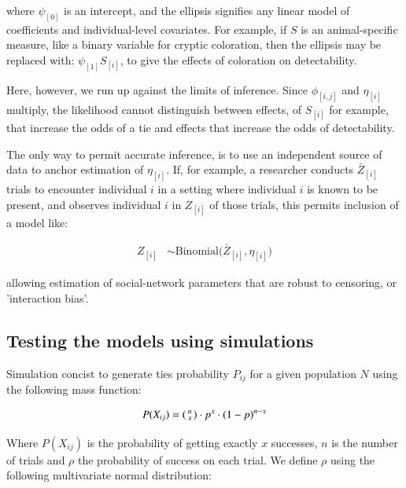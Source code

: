 \documentclass[Afour,sageh,times]{sagej}
\begin{document}
where $\psi_{[0]}$ is an intercept, and the ellipsis signifies any linear model of coefficients and individual-level covariates. For example, if $S$ is an animal-specific measure, like a binary variable for cryptic coloration, then the ellipsis  may be replaced with:  $\psi_{[1]}S_{[i]}$, to give the effects of coloration on detectability.

Here, however, we run up against the limits of inference. Since $\phi_{[i,j]}$ and $\eta_{[i]}$ multiply, the likelihood cannot distinguish between effects, of $S_{[i]}$ for example, that increase the odds of a tie and effects that increase the odds of detectability.

The only way to permit accurate inference, is to use an independent source of data to anchor estimation of $\eta_{[i]}$. If, for example, a researcher conducts $\bar Z_{[i]}$ trials to encounter individual $i$ in a setting where individual $i$ is known to be present, and observes individual $i$ in $Z_{[i]}$ of those trials, this permits inclusion of a model like:
\begin{ceqn}
\begin{align}\label{maineq2}
 Z_{[i]} &\sim \mathrm{Binomial}\Big(\bar Z_{[i]}, \eta_{[i]} \Big)
\end{align}
\end{ceqn}
allowing estimation of social-network parameters that are robust to censoring, or 'interaction bias'.

\subsection{Testing the models using simulations}

Simulation concist to generate ties probability $P_{ij}$ for a given population $N$ using the following mass function:

\begin{ceqn}
  \begin{align}\label{mass}
    P(X_{ij}) = 
    \begin{psmallmatrix}
      n\\
      x
    \end{psmallmatrix}\cdot   p^{x} \cdot (1-p)^{n-x}  
  \end{align}    
\end{ceqn}
Where $P(X_{ij})$ is the probability of getting exactly $x$ successes, $n$ is the number of trials and $\rho$ the probability of success on each trial. We define $\rho$ using the following multivariate normal distribution:
\end{document}
